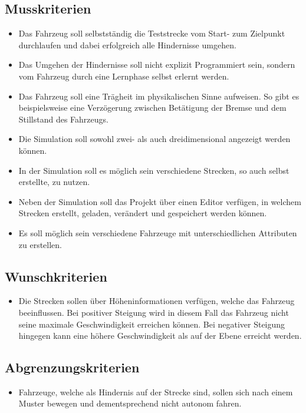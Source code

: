 \documentclass[11pt,a4paper]{article}
\begin{document}
	\subsection{Musskriterien}
	\begin{itemize}
		\item Das Fahrzeug soll selbstständig die Teststrecke vom Start- zum Zielpunkt durchlaufen und dabei erfolgreich alle Hindernisse umgehen.
		\item Das Umgehen der Hindernisse soll nicht explizit Programmiert sein, sondern vom Fahrzeug durch eine Lernphase selbst erlernt werden.
		\item Das Fahrzeug soll eine Trägheit im physikalischen Sinne aufweisen. So gibt es beispielsweise eine Verzögerung zwischen Betätigung der Bremse und dem Stillstand des Fahrzeugs.
		\item Die Simulation soll sowohl zwei- als auch dreidimensional angezeigt werden können.
		\item In der Simulation soll es möglich sein verschiedene Strecken, so auch selbst erstellte, zu nutzen.
		\item Neben der Simulation soll das Projekt über einen Editor verfügen, in welchem Strecken erstellt, geladen, verändert und gespeichert werden können.
		\item Es soll möglich sein verschiedene Fahrzeuge mit unterschiedlichen Attributen zu erstellen.
	\end{itemize}
	
	\subsection{Wunschkriterien}
	\begin{itemize}
		\item Die Strecken sollen über Höheninformationen verfügen, welche das Fahrzeug beeinflussen. Bei positiver Steigung wird in diesem Fall das Fahrzeug nicht seine maximale Geschwindigkeit erreichen können. Bei negativer Steigung hingegen kann eine höhere Geschwindigkeit als auf der Ebene erreicht werden.
	\end{itemize}
	
	\subsection{Abgrenzungskriterien}
	\begin{itemize}
		\item Fahrzeuge, welche als Hindernis auf der Strecke sind, sollen sich nach einem Muster bewegen und dementsprechend nicht autonom fahren.
	\end{itemize}
	
\end{document}

